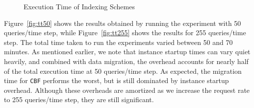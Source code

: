 \begin{figure}[htp]
\begin{center}
\end{center}
\caption{Execution Time of Indexing Schemes}
\end{figure}

Figure~\ref{fig:tt50} shows the results obtained by running the experiment with
50 queries/time step, while Figure~\ref{fig:tt255} shows the results for 255
queries/time step. The total time taken to run the experiments varied between
50 and 70 minutes. As mentioned earlier, we note that instance startup times
can vary quiet heavily, and combined with data migration, the overhead accounts
for nearly half of the total execution time at 50 queries/time step. As
expected, the migration time for {\tt CBF} performs the worst, but is still
dominated by instance startup overhead. Although these overheads are amortized
as we increase the request rate to 255 queries/time step, they are still
significant.

